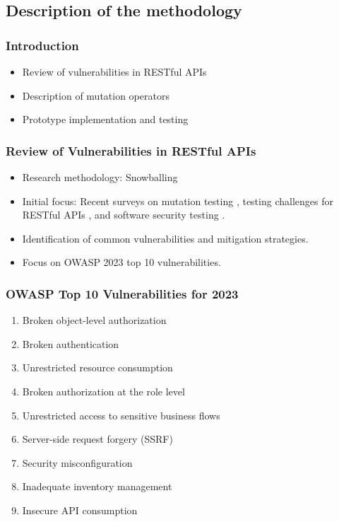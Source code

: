 \documentclass[10pt]{beamer}
\theoremstyle{remark}
\theoremstyle{definition}
\begin{document}
\subsection{Description of the methodology}

\begin{frame}
    \frametitle{Introduction}
    \begin{itemize}
        \item Review of vulnerabilities in RESTful APIs
        \item Description of mutation operators
        \item Prototype implementation and testing
    \end{itemize}
\end{frame}

\begin{frame}
    \frametitle{Review of Vulnerabilities in RESTful APIs}
    \begin{itemize}
        \item Research methodology: Snowballing \cite{Chaim2008}
        \item Initial focus: Recent surveys on mutation testing \cite{Papadakis2019}, testing challenges for RESTful APIs \cite{Ehsan2022}, and software security testing \cite{Golmohammadi2023}.
        \item Identification of common vulnerabilities and mitigation strategies.
        \item Focus on OWASP 2023 top 10 vulnerabilities.
    \end{itemize}
\end{frame}

\begin{frame}
    \frametitle{OWASP Top 10 Vulnerabilities for 2023}
    \begin{enumerate}
        \item Broken object-level authorization
        \item Broken authentication
        \item Unrestricted resource consumption
        \item Broken authorization at the role level
        \item Unrestricted access to sensitive business flows
        \item Server-side request forgery (SSRF)
        \item Security misconfiguration
        \item Inadequate inventory management
        \item Insecure API consumption
    \end{enumerate}
\end{frame}
\end{document}
